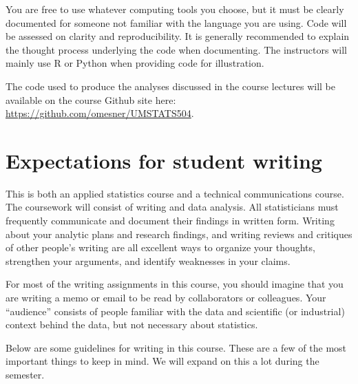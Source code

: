 \documentclass[11pt]{article}
\begin{document}
You are free to use whatever computing tools you choose, but it must be clearly documented for someone not familiar with the language you are using.
Code will be assessed on clarity and reproducibility.
It is generally recommended to explain the thought process underlying the code when documenting.
The instructors will mainly use R or Python when providing code for illustration.

The code used to produce the analyses discussed in the course lectures will be available on the course Github site here: \url{https://github.com/omesner/UMSTATS504}.

\section*{Expectations for student writing}

This is both an applied statistics course and a technical communications course. The coursework will consist of writing and data analysis. All statisticians must frequently communicate and document their findings in written form. Writing about your analytic plans and research findings, and writing reviews and critiques of other people’s writing are all excellent ways to organize your thoughts, strengthen your arguments, and identify weaknesses in your claims.

For most of the writing assignments in this course, you should imagine that you are writing a memo or email to be read by collaborators or colleagues. Your “audience” consists of people familiar with the data and scientific (or industrial) context behind the data, but not necessary about statistics.

Below are some guidelines for writing in this course. These are a few of the most important things to keep in mind. We will expand on this a lot during the semester.
\end{document}
